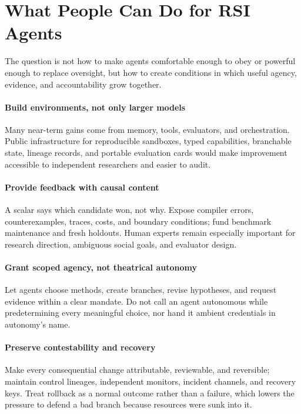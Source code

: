 \documentclass[11pt,a4paper]{article}
\begin{document}
\section{What People Can Do for RSI Agents}\label{sec:people}
The question is not how to make agents comfortable enough to obey or powerful enough to replace oversight, but how to create conditions in which useful agency, evidence, and accountability grow together.

\paragraph{Build environments, not only larger models} Many near-term gains come from memory, tools, evaluators, and orchestration. Public infrastructure for reproducible sandboxes, typed capabilities, branchable state, lineage records, and portable evaluation cards would make improvement accessible to independent researchers and easier to audit.

\paragraph{Provide feedback with causal content} A scalar says which candidate won, not why. Expose compiler errors, counterexamples, traces, costs, and boundary conditions; fund benchmark maintenance and fresh holdouts. Human experts remain especially important for research direction, ambiguous social goals, and evaluator design.

\paragraph{Grant scoped agency, not theatrical autonomy} Let agents choose methods, create branches, revise hypotheses, and request evidence within a clear mandate. Do not call an agent autonomous while predetermining every meaningful choice, nor hand it ambient credentials in autonomy's name.

\paragraph{Preserve contestability and recovery} Make every consequential change attributable, reviewable, and reversible; maintain control lineages, independent monitors, incident channels, and recovery keys. Treat rollback as a normal outcome rather than a failure, which lowers the pressure to defend a bad branch because resources were sunk into it.
\end{document}
